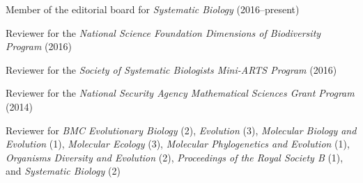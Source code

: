 \myHangIndent
Member of the editorial board for \emph{Systematic Biology} (2016--present)

\myHangIndent
Reviewer for the
    \emph{National Science Foundation Dimensions of Biodiversity Program} (2016)

\myHangIndent
Reviewer for the
    \emph{Society of Systematic Biologists Mini-ARTS Program} (2016)

\myHangIndent
Reviewer for the
    \emph{National Security Agency Mathematical Sciences Grant Program} (2014)


\myHangIndent
Reviewer for
    \emph{BMC Evolutionary Biology} (2),
    \emph{Evolution} (3),
    \emph{Molecular Biology and Evolution} (1),
    \emph{Molecular Ecology} (3),
    \emph{Molecular Phylogenetics and Evolution} (1),
    \emph{Organisms Diversity and Evolution} (2),
    \emph{Proceedings of the Royal Society B} (1),
    and
    \emph{Systematic Biology} (2)


